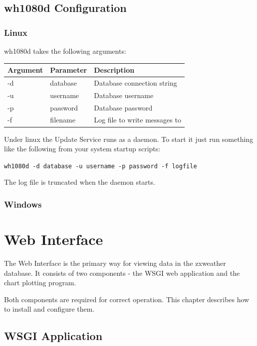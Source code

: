 \documentclass[a4paper,10pt,draft]{book}
\begin{document}
\section{wh1080d Configuration}
\subsection{Linux}

wh1080d takes the following arguments:

\begin{tabular}{l l p{10cm}}
\hline
\textbf{Argument} & \textbf{Parameter} & \textbf{Description} \\
\hline
-d & database & Database connection string \\
-u & username & Database username \\
-p & password & Database password \\
-f & filename & Log file to write messages to \\
\hline
\end{tabular}

Under linux the Update Service runs as a daemon. To start it just run something like the following from your system startup scripts:

\verb|wh1080d -d database -u username -p password -f logfile|

The log file is truncated when the daemon starts.

\subsection{Windows}


\chapter{Web Interface}
\label{cha_web_interface}

The Web Interface is the primary way for viewing data in the zxweather database. It consists of two components - the WSGI web application and the chart plotting program.

Both components are required for correct operation. This chapter describes how to install and configure them.


\section{WSGI Application}
\end{document}
